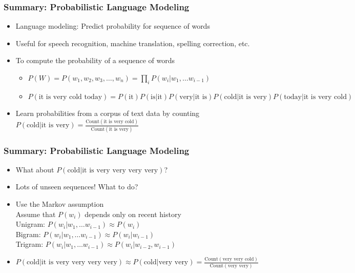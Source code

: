 \begin{frame}
\frametitle{Summary: Probabilistic Language Modeling}
\begin{itemize}[<+->]
\item Language modeling: Predict probability for sequence of words
\item Useful for speech recognition, machine translation, spelling correction, etc.  
\item To compute the probability of a sequence of words
  \begin{itemize}[<+->]
  \item  $P(W) = P(w_1, w_2, w_3, \ldots, w_n) = \prod_i P(w_i | w_1, \ldots w_{i-1})$
  \item $P(\text{it is very cold today}) = P(\text{it}) P(\text{is}|\text{it}) P(\text{very}|\text{it is}) P(\text{cold}|\text{it is very}) P(\text{today}|\text{it is very cold})$ 
  \end{itemize}
\item Learn probabilities from a corpus of text data by counting\\
  $P(\text{cold}|\text{it is very}) = \frac{\text{Count}(\text{it is very cold})}{\text{Count}(\text{it is very})}$
\end{itemize}
\end{frame}


\begin{frame}
\frametitle{Summary: Probabilistic Language Modeling}
\begin{itemize}[<+->]
\item What about $P(\text{cold}|\text{it is very very very very})$? 
\item Lots of unseen sequences!  What to do?
\item Use the Markov assumption \\
  Assume that $P(w_i)$ depends only on recent history \\
  Unigram: $P(w_i | w_1, \ldots w_{i-1}) \approx P(w_i)$  \\
  Bigram: $P(w_i | w_1, \ldots w_{i-1}) \approx P(w_i | w_{i-1})$ \\
  Trigram: $P(w_i | w_1, \ldots w_{i-1}) \approx P(w_i | w_{i-2}, w_{i-1})$ 
\item
  $P(\text{cold}|\text{it is very very very very}) \approx P(\text{cold} | \text{very very}) = \frac{\text{Count}(\text{very very cold})}{\text{Count}(\text{very very})}$
\end{itemize}
\end{frame}


